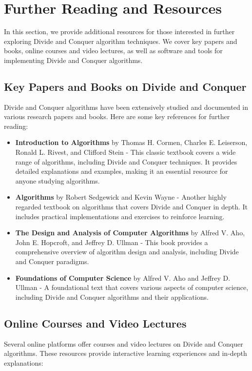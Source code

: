\documentclass[12pt]{book} %
\begin{document}
\section{Further Reading and Resources}
In this section, we provide additional resources for those interested in further exploring Divide and Conquer algorithm techniques. We cover key papers and books, online courses and video lectures, as well as software and tools for implementing Divide and Conquer algorithms.

\subsection{Key Papers and Books on Divide and Conquer}
Divide and Conquer algorithms have been extensively studied and documented in various research papers and books. Here are some key references for further reading:

\begin{itemize}
    \item \textbf{Introduction to Algorithms} by Thomas H. Cormen, Charles E. Leiserson, Ronald L. Rivest, and Clifford Stein - This classic textbook covers a wide range of algorithms, including Divide and Conquer techniques. It provides detailed explanations and examples, making it an essential resource for anyone studying algorithms.
    
    \item \textbf{Algorithms} by Robert Sedgewick and Kevin Wayne - Another highly regarded textbook on algorithms that covers Divide and Conquer in depth. It includes practical implementations and exercises to reinforce learning.
    
    \item \textbf{The Design and Analysis of Computer Algorithms} by Alfred V. Aho, John E. Hopcroft, and Jeffrey D. Ullman - This book provides a comprehensive overview of algorithm design and analysis, including Divide and Conquer paradigms.
    
    \item \textbf{Foundations of Computer Science} by Alfred V. Aho and Jeffrey D. Ullman - A foundational text that covers various aspects of computer science, including Divide and Conquer algorithms and their applications.
\end{itemize}

\subsection{Online Courses and Video Lectures}
Several online platforms offer courses and video lectures on Divide and Conquer algorithms. These resources provide interactive learning experiences and in-depth explanations:
\end{document}
